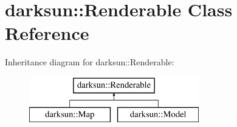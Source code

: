 \hypertarget{classdarksun_1_1_renderable}{}\section{darksun\+::Renderable Class Reference}
\label{classdarksun_1_1_renderable}
Inheritance diagram for darksun\+::Renderable\+:\begin{figure}[H]
\begin{center}
\leavevmode
\includegraphics[height=2.000000cm]{classdarksun_1_1_renderable}
\end{center}
\end{figure}
